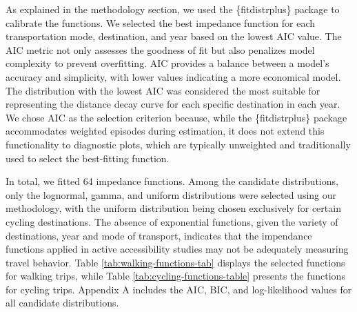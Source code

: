 \documentclass[preprint, 3p,
authoryear]{elsarticle} %
\begin{document}
As explained in the methodology section, we used the \{fitdistrplus\}
package to calibrate the functions. We selected the best impedance
function for each transportation mode, destination, and year based on
the lowest AIC value. The AIC metric not only assesses the goodness of
fit but also penalizes model complexity to prevent overfitting. AIC
provides a balance between a model's accuracy and simplicity, with lower
values indicating a more economical model. The distribution with the
lowest AIC was considered the most suitable for representing the
distance decay curve for each specific destination in each year. We
chose AIC as the selection criterion because, while the \{fitdistrplus\}
package accommodates weighted episodes during estimation, it does not
extend this functionality to diagnostic plots, which are typically
unweighted and traditionally used to select the best-fitting function.

In total, we fitted 64 impedance functions. Among the candidate
distributions, only the lognormal, gamma, and uniform distributions were
selected using our methodology, with the uniform distribution being
chosen exclusively for certain cycling destinations. The absence of
exponential functions, given the variety of destinations, year and mode
of transport, indicates that the impendance functions applied in active
accessibility studies may not be adequately measuring travel behavior.
Table \ref{tab:walking-functions-tab} displays the selected functions
for walking trips, while Table \ref{tab:cycling-functions-table}
presents the functions for cycling trips. Appendix A includes the AIC,
BIC, and log-likelihood values for all candidate distributions.
\end{document}
